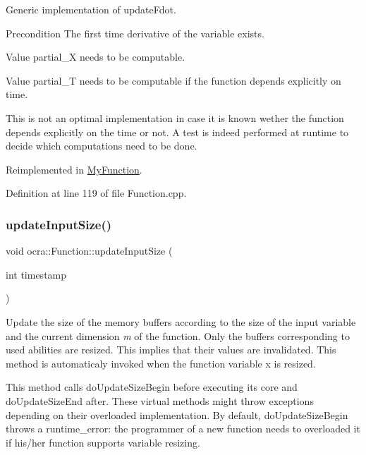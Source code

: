 Generic implementation of update\+Fdot.

\begin{DoxyPrecond}{Precondition}
The first time derivative of the variable exists. 

Value partial\+\_\+X needs to be computable. 

Value partial\+\_\+T needs to be computable if the function depends explicitly on time.
\end{DoxyPrecond}
This is not an optimal implementation in case it is known wether the function depends explicitly on the time or not. A test is indeed performed at runtime to decide which computations need to be done. 

Reimplemented in \hyperlink{classMyFunction_af0219da97114570582c6a02cf072a7db}{My\+Function}.



Definition at line 119 of file Function.\+cpp.

\hypertarget{classocra_1_1Function_a3a5b9e6ae296339acc87ab2cbf97ef98}{}\label{classocra_1_1Function_a3a5b9e6ae296339acc87ab2cbf97ef98} 
\subsubsection{\texorpdfstring{update\+Input\+Size()}{updateInputSize()}}
{\footnotesize\ttfamily void ocra\+::\+Function\+::update\+Input\+Size (\begin{DoxyParamCaption}\item[{int}]{timestamp }\end{DoxyParamCaption})\hspace{0.3cm}{\ttfamily [protected]}}

Update the size of the memory buffers according to the size of the input variable and the current dimension {\itshape m} of the function. Only the buffers corresponding to used abilities are resized. This implies that their values are invalidated. This method is automaticaly invoked when the function variable {\ttfamily x} is resized.

This method calls {\ttfamily do\+Update\+Size\+Begin} before executing its core and do\+Update\+Size\+End after. These virtual methods might throw exceptions depending on their overloaded implementation. By default, do\+Update\+Size\+Begin throws a runtime\+\_\+error\+: the programmer of a new function needs to overloaded it if his/her function supports variable resizing.

